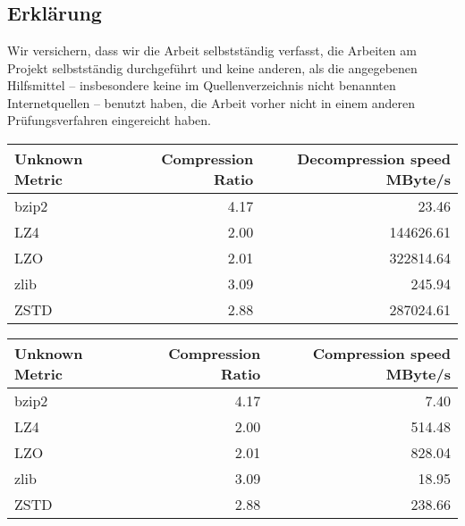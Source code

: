 \documentclass[
	12pt,
	a4paper,
	BCOR10mm,
	DIV14,
	listof=totoc,
	bibliography=totoc,
	headsepline
]{scrreprt}
\begin{document}
\listoftables

\lstlistoflistings

\newpage

\thispagestyle{empty}

\chapter*{}

\section*{Erklärung}

Wir versichern, dass wir die Arbeit selbstständig verfasst, die Arbeiten am Projekt selbstständig durchgeführt und keine anderen, als die angegebenen Hilfsmittel -- insbesondere keine im Quellenverzeichnis nicht benannten Internetquellen -- benutzt haben, die Arbeit vorher nicht in einem anderen Prüfungsverfahren eingereicht haben.

\smallskip

\bigskip
\bigskip
\bigskip

\begin{tabular}{lrr}
\hline
 Unknown Metric   &   Compression Ratio &   Decompression speed MByte/s \\
\hline
 bzip2            &                4.17 &                         23.46 \\
 LZ4              &                2.00 &                     144626.61 \\
 LZO              &                2.01 &                     322814.64 \\
 zlib             &                3.09 &                        245.94 \\
 ZSTD             &                2.88 &                     287024.61 \\
\hline
\end{tabular}
\begin{tabular}{lrr}
\hline
 Unknown Metric   &   Compression Ratio &   Compression speed MByte/s \\
\hline
 bzip2            &                4.17 &                        7.40 \\
 LZ4              &                2.00 &                      514.48 \\
 LZO              &                2.01 &                      828.04 \\
 zlib             &                3.09 &                       18.95 \\
 ZSTD             &                2.88 &                      238.66 \\
\hline
\end{tabular}
\end{document}
